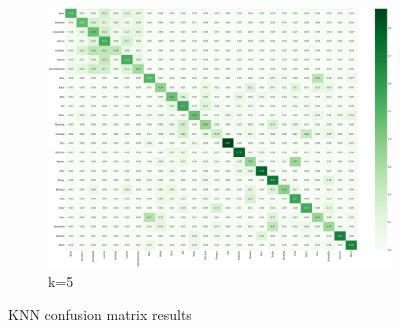 \begin{figure}
\begin{subfigure}[b]{0.49\textwidth}
        \includegraphics[width=\textwidth]{assets/evaluation_results/KNN/confusion_matrix_k_5.png}
        \caption{k=5}
    \end{subfigure}
    \caption{KNN confusion matrix results}
    \label{fig:knn-confusion-matrix-results}
\end{figure}


